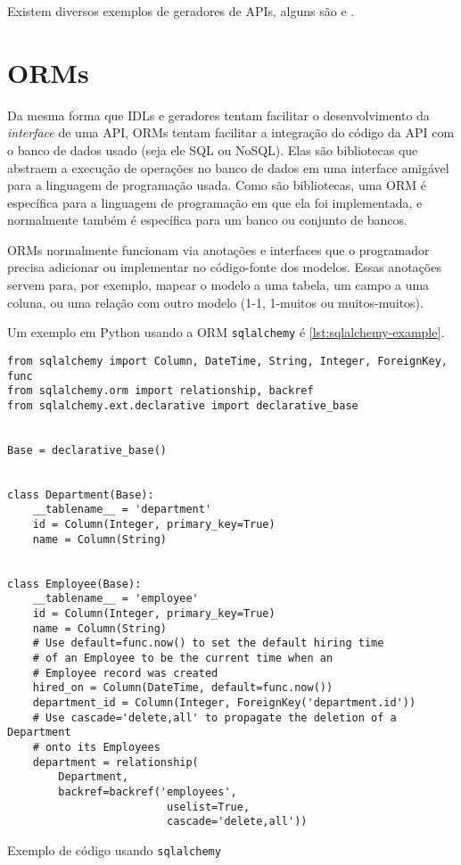 Existem diversos exemplos de geradores de APIs, alguns são \cite{openapi:gen} e
\cite{googl:protobuf}.

\section{ORMs}

Da mesma forma que IDLs e geradores tentam facilitar o desenvolvimento da
\textit{interface} de uma API, ORMs tentam facilitar a integração do código da
API com o banco de dados usado (seja ele SQL ou NoSQL). Elas são bibliotecas que
abstraem a execução de operações no banco de dados em uma interface amigável para
a linguagem de programação usada. Como são bibliotecas, uma ORM é específica para
a linguagem de programação em que ela foi implementada, e normalmente também é
específica para um banco ou conjunto de bancos.

ORMs normalmente funcionam via anotações e interfaces que o programador precisa
adicionar ou implementar no código-fonte dos modelos. Essas anotações servem para,
por exemplo, mapear o modelo a uma tabela, um campo a uma coluna, ou uma relação
com outro modelo (1-1, 1-muitos ou muitos-muitos).

Um exemplo em Python usando a ORM \texttt{sqlalchemy} é \cref{lst:sqlalchemy-example}.

\begin{listing}[ht]
\begin{verbatim}
from sqlalchemy import Column, DateTime, String, Integer, ForeignKey, func
from sqlalchemy.orm import relationship, backref
from sqlalchemy.ext.declarative import declarative_base


Base = declarative_base()


class Department(Base):
    __tablename__ = 'department'
    id = Column(Integer, primary_key=True)
    name = Column(String)


class Employee(Base):
    __tablename__ = 'employee'
    id = Column(Integer, primary_key=True)
    name = Column(String)
    # Use default=func.now() to set the default hiring time
    # of an Employee to be the current time when an
    # Employee record was created
    hired_on = Column(DateTime, default=func.now())
    department_id = Column(Integer, ForeignKey('department.id'))
    # Use cascade='delete,all' to propagate the deletion of a Department
    # onto its Employees
    department = relationship(
        Department,
        backref=backref('employees',
                         uselist=True,
                         cascade='delete,all'))

\end{verbatim}
\caption{Exemplo de código usando \texttt{sqlalchemy}}
\label{lst:sqlalchemy-example}
\end{listing}

